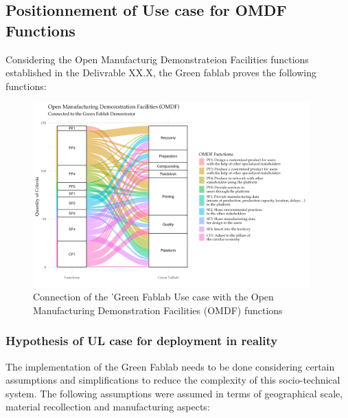\documentclass[
  11pt,
]{article}
\begin{document}
\hypertarget{positionnement-of-use-case-for-omdf-functions}{%
\subsection{Positionnement of Use case for OMDF
Functions}\label{positionnement-of-use-case-for-omdf-functions}}

Considering the Open Manufacturig Demonstrateion Facilities functions
established in the Delivrable XX.X, the Green fablab proves the
following functions:

\begin{figure}[H]

{\centering \includegraphics[width=0.95\textwidth,height=\textheight]{figures/Sankey-GF-Global.jpg}

}

\caption{\label{fig-dram}Connection of the 'Green Fablab Use case with
the Open Manufacturing Demonstration Facilities (OMDF) functions}

\end{figure}

\hypertarget{hypothesis-of-ul-case-for-deployment-in-reality}{%
\subsubsection{Hypothesis of UL case for deployment in
reality}\label{hypothesis-of-ul-case-for-deployment-in-reality}}

The implementation of the Green Fablab needs to be done considering
certain assumptions and simplifications to reduce the complexity of this
socio-technical system. The following assumptions were assumed in terms
of geographical scale, material recollection and manufacturing aspects:
\end{document}
